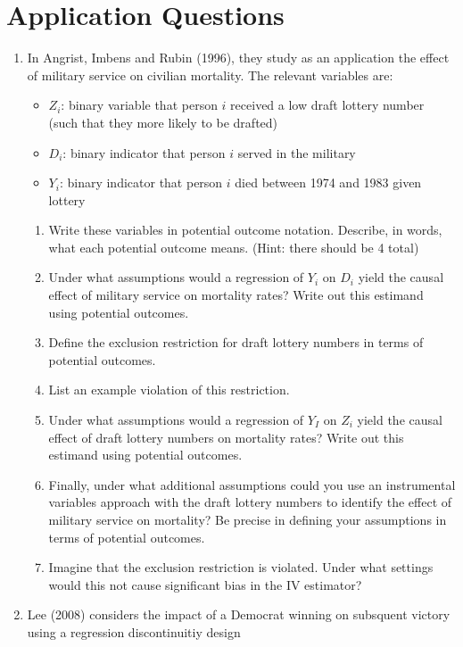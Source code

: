 \documentclass[11pt, a4paper]{article}
\begin{document}
\section{Application Questions}
\begin{enumerate}
\item In Angrist, Imbens and Rubin (1996), they study as an
  application the effect of military service on civilian
  mortality. The relevant variables are:
  \begin{itemize}
  \item $Z_{i}$: binary variable that person $i$ received a low draft lottery number (such
    that they more likely to be drafted)
  \item $D_{i}$: binary indicator that person $i$ served in the military
  \item $Y_{i}$: binary indicator that person $i$ died between 1974 and 1983 given lottery
  \end{itemize}
  \begin{enumerate}
    \item Write these variables in potential outcome notation. Describe, in words, what each potential outcome means. (Hint: there should be 4 total)
    \item Under what assumptions would a regression of $Y_{i}$ on $D_{i}$ yield the causal effect of military service on mortality rates? Write out this estimand using potential outcomes.
    \item Define the exclusion restriction for draft lottery numbers in terms of potential outcomes.
    \item List an example violation of this restriction.
    \item Under what assumptions would a regression of $Y_{I}$ on $Z_{i}$ yield the causal effect of draft lottery numbers on mortality rates? Write out this estimand using potential outcomes.
    \item Finally, under what additional assumptions could you use an
      instrumental variables approach with the draft lottery numbers
      to identify the effect of military service on mortality? Be
      precise in defining your assumptions in terms of potential
      outcomes.
    \item Imagine that the exclusion restriction is violated. Under
      what settings would this not cause significant bias in the IV
      estimator?
    \end{enumerate}
  \item Lee (2008) considers the impact of a Democrat winning on subsquent victory using a regression discontinuitiy design

\end{enumerate}
\end{document}
